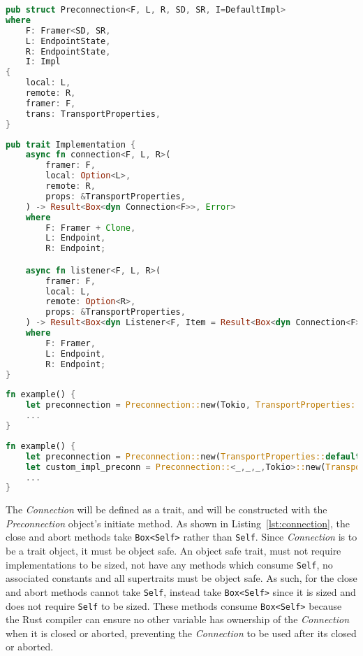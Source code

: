 \begin{lstlisting}[language=Rust, float=h, label=lst:preconnection, caption={The Preconnection struct, showing the four
    generic parameters.}]
pub struct Preconnection<F, L, R, SD, SR, I=DefaultImpl>
where
    F: Framer<SD, SR,
    L: EndpointState,
    R: EndpointState,
    I: Impl
{
    local: L,
    remote: R,
    framer: F,
    trans: TransportProperties,
}
\end{lstlisting}

\begin{lstlisting}[language=Rust, float=h, label=lst:impl, caption={The Implementation trait.}]
pub trait Implementation {
    async fn connection<F, L, R>(
        framer: F,
        local: Option<L>,
        remote: R,
        props: &TransportProperties,
    ) -> Result<Box<dyn Connection<F>>, Error>
    where
        F: Framer + Clone,
        L: Endpoint,
        R: Endpoint;

    async fn listener<F, L, R>(
        framer: F,
        local: L,
        remote: Option<R>,
        props: &TransportProperties,
    ) -> Result<Box<dyn Listener<F, Item = Result<Box<dyn Connection<F>>, Error>>>, Error>
    where
        F: Framer,
        L: Endpoint,
        R: Endpoint;
}
\end{lstlisting}

\begin{lstlisting}[language=Rust, float=h, label=lst:preconnBad, caption={An example of how to construct a
Preconnection if the Implementation trait is to be passed when the Preconnection is constructed}]
fn example() {
    let preconnection = Preconnection::new(Tokio, TransportProperties::default(), ...);
    ...
}
\end{lstlisting}

\begin{lstlisting}[language=Rust, float=h, label=lst:preconnGood, caption={An example of how to construct a
    Preconnection if the Implementation trait is used as a marker.}]
fn example() {
    let preconnection = Preconnection::new(TransportProperties::default(), ...);
    let custom_impl_preconn = Preconnection::<_,_,_,Tokio>::new(TransportProperties::default(), ...);
    ...
}
\end{lstlisting}

The \emph{Connection} will be defined as a trait, and will be constructed with the \emph{Preconnection} object's
initiate method.
As shown in Listing~\ref{lst:connection}, the close and abort methods take \texttt{Box<Self>} rather than \texttt{Self}.
Since \emph{Connection} is to be a trait object, it must be object safe.
An object safe trait, must not require implementations to be sized, not have any methods which consume \texttt{Self}, no
associated constants and all supertraits must be object safe.
As such, for the close and abort methods cannot take \texttt{Self}, instead take \texttt{Box<Self>} since it is sized
and does not require \texttt{Self} to be sized.
These methods consume \texttt{Box<Self>} because the Rust compiler can ensure no other variable has ownership of the
\emph{Connection} when it is closed or aborted, preventing the \emph{Connection} to be used after its closed or aborted.

